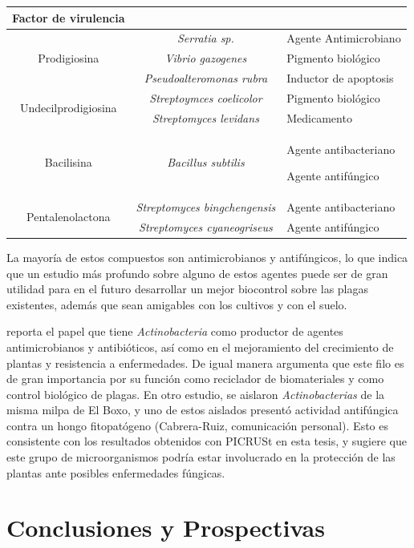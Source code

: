 \documentclass[12pt,letterpaper,oneside]{report}
\begin{document}
\begin{longtable}[c]{ccm{5cm}}
Factor de virulencia \\
\hline
\multirow{3}{*}{Prodigiosina} & \textit{Serratia sp.} & Agente Antimicrobiano\\
& \textit{Vibrio gazogenes} & Pigmento biológico \\
& \textit{Pseudoalteromonas rubra} & Inductor de apoptosis\\
\hline
\multirow{2}{*}{Undecilprodigiosina} & \textit{Streptoymces coelicolor} & Pigmento biológico\\
& \textit{Streptomyces levidans} & Medicamento \\
\hline
Bacilisina & \textit{Bacillus subtilis} & Agente antibacteriano

Agente antifúngico \\
\hline
\multirow{2}{*}{Pentalenolactona} & \textit{Streptomyces bingchengensis} & Agente antibacteriano \\
& \textit{Streptomyces cyaneogriseus} & Agente antifúngico \\
\bottomrule[0.5mm]
\end{longtable}
\par
La mayoría de estos compuestos son antimicrobianos y antifúngicos, lo que indica que un estudio más profundo sobre alguno de estos agentes puede ser de gran utilidad para en el futuro desarrollar un mejor biocontrol sobre las plagas existentes, además que sean amigables con los cultivos y con el suelo.
\par
\textcite{Barka2015} reporta el papel que tiene \textit{Actinobacteria} como productor de agentes antimicrobianos y antibióticos, así como en el mejoramiento del crecimiento de plantas y resistencia a enfermedades. De igual manera argumenta que este filo es de gran importancia por su función como reciclador de biomateriales y como control biológico de plagas.
En otro estudio, se aislaron \textit{Actinobacterias} de la misma milpa de El Boxo, y uno de estos aislados presentó actividad antifúngica contra un hongo fitopatógeno (Cabrera-Ruiz, comunicación personal). Esto es consistente con los resultados obtenidos con PICRUSt en esta tesis, y sugiere que este grupo de microorganismos podría estar involucrado en la protección de las plantas ante posibles enfermedades fúngicas.
\chapter{Conclusiones y Prospectivas}
\end{document}
